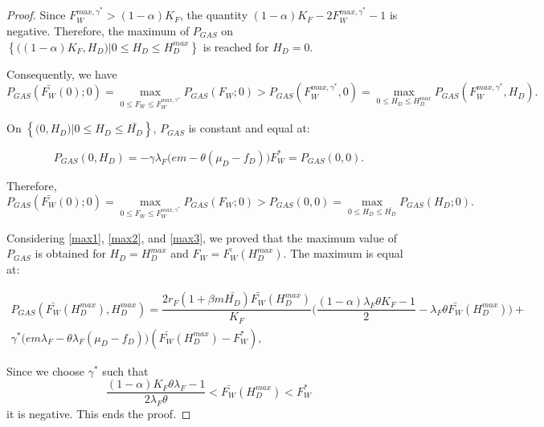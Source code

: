 \documentclass{article}
\newcommand{\lfw}{\lambda_{F}}
\newcommand{\lfw}{\lambda_{F}}
\newcommand{\YD}[1]{\textcolor{magenta}{#1}}
\begin{document}
\begin{proof}
Since $F_W^{max, \gamma^*} > (1-\alpha)K_F$, the quantity $(1-\alpha)K_F - 2F_W^{max, \gamma^*} - 1$ is negative.
Therefore, the maximum of $P_{GAS}$ on $\left\lbrace\big((1-\alpha)K_F, H_D \big) | 0 \leq H_D \leq H_D^{max} \right\rbrace$ is reached for $H_D = 0$.

Consequently, we have 
\begin{equation} \label{max2}
P_{GAS}(\bar{F_W}(0) ; 0) = \max_{0 \leq F_W \leq F_W^{max, \gamma^*}} P_{GAS}(F_W ; 0) > P_{GAS}(F_W^{max, \gamma^*} , 0) = \max_{0 \leq H_D \leq H_D^{max}} P_{GAS}(F_W^{max, \gamma^*}, H_D).
\end{equation}

On $\left\lbrace\big(0, H_D \big) | 0 \leq H_D \leq \bar{H_D} \right\rbrace$, $P_{GAS}$ is constant and equal at:

$$P_{GAS}(0, H_D) = - \gamma \lfw \Big(em - \theta (\mu_D - f_D)\Big) F_W^* = P_{GAS}(0, 0).$$

Therefore,
\begin{equation}\label{max3}
P_{GAS}(\bar{F_W}(0) ; 0) = \max_{0 \leq F_W \leq F_W^{max, \gamma^*}} P_{GAS}(F_W ; 0) > P_{GAS}(0, 0) = \max_{0 \leq H_D \leq \bar{H_D}} P_{GAS}(H_D; 0).
\end{equation}

Considering \eqref{max1}, \eqref{max2}, and \eqref{max3}, we proved that the maximum value of $P_{GAS}$ is obtained for $H_D = H_D^{max}$ and $F_W = \bar{F_W}( H_D^{max})$. The maximum is equal at:

\begin{multline*}
P_{GAS}(\bar{F_W}(H_D^{max}) ,  H_D^{max}) = \dfrac{2 r_F(1+ \beta m \bar{H_D}) \bar{F_W}(H_D^{max})}{K_F} \Big(\dfrac{(1-\alpha) \lfw \theta K_F - 1}{2} - \lfw \theta \bar{F_W}(H_D^{max}) \Big) +  \\ \gamma^* \Big(e m \lfw - \theta \lfw(\mu_D - f_D) \Big)( \bar{F_W}(H_D^{max}) - F_W^*),
\end{multline*}

Since we choose  $\gamma^*$ such that \begin{equation}\label{inequalitiesGAS}
\dfrac{(1-\alpha) K_F \theta \lfw -1}{2 \lfw \theta} < \bar{F_W}(H_D^{max}) < F_W^*
\end{equation} 
it is negative. This ends the proof.


%
\end{proof}
\end{document}
